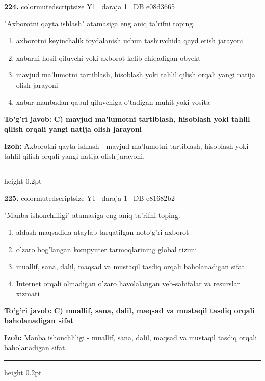 \documentclass[10pt,a4paper,oneside]{article}
\begin{document}
\noindent\textbf{\color{ink}224.}  {color{muted}scriptsize Y1 \textbullet\ daraja 1 \textbullet\ DB e08d3665}
\par
"Axborotni qayta ishlash" atamasiga eng aniq ta'rifni toping.
\begin{enumerate}[label=\Alph*),leftmargin=9mm]
\item axborotni keyinchalik foydalanish uchun tashuvchida qayd etish jarayoni
\item xabarni hosil qiluvchi yoki axborot kelib chiqadigan obyekt
\item mavjud ma'lumotni tartiblash, hisoblash yoki tahlil qilish orqali yangi natija olish jarayoni
\item xabar manbadan qabul qiluvchiga o'tadigan muhit yoki vosita
\end{enumerate}
\begin{tcolorbox}[enhanced,breakable,colback=teal!4,colframe=teal!50!black,boxrule=0.5pt,arc=1.1mm,left=3mm,right=3mm,top=1.7mm,bottom=1.7mm,before skip=2mm,after skip=2mm]
\textbf{\color{teal}To'g'ri javob:} \textbf{C) mavjud ma'lumotni tartiblash, hisoblash yoki tahlil qilish orqali yangi natija olish jarayoni}
\par\smallskip
\textbf{Izoh:} Axborotni qayta ishlash - mavjud ma'lumotni tartiblash, hisoblash yoki tahlil qilish orqali yangi natija olish jarayoni.
\end{tcolorbox}
\vspace{2mm}\hrule height 0.2pt \vspace{3mm}

\noindent\textbf{\color{ink}225.}  {color{muted}scriptsize Y1 \textbullet\ daraja 1 \textbullet\ DB e81682b2}
\par
"Manba ishonchliligi" atamasiga eng aniq ta'rifni toping.
\begin{enumerate}[label=\Alph*),leftmargin=9mm]
\item aldash maqsadida ataylab tarqatilgan noto'g'ri axborot
\item o'zaro bog'langan kompyuter tarmoqlarining global tizimi
\item muallif, sana, dalil, maqsad va mustaqil tasdiq orqali baholanadigan sifat
\item Internet orqali olinadigan o'zaro havolalangan veb-sahifalar va resurslar xizmati
\end{enumerate}
\begin{tcolorbox}[enhanced,breakable,colback=teal!4,colframe=teal!50!black,boxrule=0.5pt,arc=1.1mm,left=3mm,right=3mm,top=1.7mm,bottom=1.7mm,before skip=2mm,after skip=2mm]
\textbf{\color{teal}To'g'ri javob:} \textbf{C) muallif, sana, dalil, maqsad va mustaqil tasdiq orqali baholanadigan sifat}
\par\smallskip
\textbf{Izoh:} Manba ishonchliligi - muallif, sana, dalil, maqsad va mustaqil tasdiq orqali baholanadigan sifat.
\end{tcolorbox}
\vspace{2mm}\hrule height 0.2pt \vspace{3mm}
\end{document}
